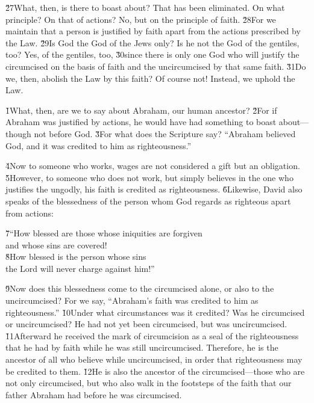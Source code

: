 \v{27}What, then, is there to boast about? That has been eliminated. On what principle? On that of actions? No, but on the principle of faith. \v{28}For we maintain that a person is justified by faith apart from the actions prescribed by the Law. \v{29}Is God the God of the Jews only? Is he not the God of the gentiles, too? Yes, of the gentiles, too, \v{30}since there is only one God who will justify the circumcised on the basis of faith and the uncircumcised by that same faith. \v{31}Do we, then, abolish the Law by this faith? Of course not! Instead, we uphold the Law.

\v{1}What, then, are we to say about Abraham, our human ancestor? \v{2}For if Abraham was justified by actions, he would have had something to boast about---though not before God. \v{3}For what does the Scripture say? ``Abraham believed God, and it was credited to him as righteousness.''

\v{4}Now to someone who works, wages are not considered a gift but an obligation. \v{5}However, to someone who does not work, but simply believes in the one who justifies the ungodly, his faith is credited as righteousness. \v{6}Likewise, David also speaks of the blessedness of the person whom God regards as righteous apart from actions:

\begin{poetry}
\poeml \v{7}``How blessed are those whose iniquities are forgiven \\
\poemll    and whose sins are covered! \\
\poeml \v{8}How blessed is the person whose sins \\
\poemll    the Lord will never charge against him!''
\end{poetry}

\v{9}Now does this blessedness come to the circumcised alone, or also to the uncircumcised? For we say, ``Abraham's faith was credited to him as righteousness.'' \v{10}Under what circumstances was it credited? Was he circumcised or uncircumcised? He had not yet been circumcised, but was uncircumcised. \v{11}Afterward he received the mark of circumcision as a seal of the righteousness that he had by faith while he was still uncircumcised. Therefore, he is the ancestor of all who believe while uncircumcised, in order that righteousness may be credited to them. \v{12}He is also the ancestor of the circumcised---those who are not only circumcised, but who also walk in the footsteps of the faith that our father Abraham had before he was circumcised.

